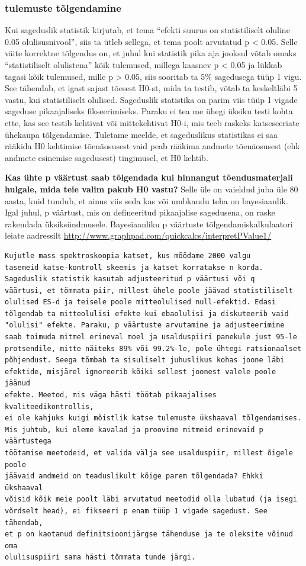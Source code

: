 \documentclass[]{book}
\begin{document}
\subsubsection{tulemuste tõlgendamine}\label{tulemuste-tolgendamine}

Kui sageduslik statistik kirjutab, et tema ``efekti suurus on
statistiliselt oluline 0.05 olulisusnivool'', siis ta ütleb sellega, et
tema poolt arvutatud p \textless{} 0.05. Selle väite korrektne tõlgendus
on, et juhul kui statistik pika aja jooksul võtab omaks ``statistiliselt
olulistena'' kõik tulemused, millega kaasnev p \textless{} 0.05 ja
lükkab tagasi kõik tulemused, mille p \textgreater{} 0.05, siis sooritab
ta 5\% sagedusega tüüp 1 vigu. See tähendab, et igast sajast tõesest
H0-st, mida ta testib, võtab ta keskeltläbi 5 vastu, kui statistiliselt
olulised. Sageduslik statistika on parim viis tüüp 1 vigade sageduse
pikaajaliseks fikseerimiseks. Paraku ei tea me ühegi üksiku testi kohta
ette, kas see testib kehtivat või mittekehtivat H0-i, mis teeb raskeks
katseseeriate ühekaupa tõlgendamise. Tuletame meelde, et sageduslikus
statistikas ei saa rääkida H0 kehtimise tõenäosusest vaid peab rääkima
andmete tõenäosusest (ehk andmete esinemise sagedusest) tingimusel, et
H0 kehtib.

\textbf{Kas ühte p väärtust saab tõlgendada kui hinnangut
tõendusmaterjali hulgale, mida teie valim pakub H0 vastu?} Selle üle on
vaieldud juba üle 80 aasta, kuid tundub, et ainus viis seda kas või
umbkaudu teha on bayesiaanlik. Igal juhul, p väärtust, mis on
defineeritud pikaajalise sagedusena, on raske rakendada üksiksündmusele.
Bayesiaanliku p väärtuste tõlgendamiskalkulaatori leiate aadressilt
\url{http://www.graphpad.com/quickcalcs/interpretPValue1/}

\begin{verbatim}
Kujutle mass spektroskoopia katset, kus mõõdame 2000 valgu 
tasemeid katse-kontroll skeemis ja katset korratakse n korda. 
Sageduslik statistik kasutab adjusteeritud p väärtusi või q 
väärtusi, et tõmmata piir, millest ühele poole jäävad statistiliselt 
olulised ES-d ja teisele poole mitteolulised null-efektid. Edasi 
tõlgendab ta mitteolulisi efekte kui ebaolulisi ja diskuteerib vaid 
"olulisi" efekte. Paraku, p väärtuste arvutamine ja adjusteerimine 
saab toimuda mitmel erineval moel ja usalduspiiri panekule just 95-le 
protsendile, mitte näiteks 89% või 99.2%-le, pole ühtegi ratsionaalset 
põhjendust. Seega tõmbab ta sisuliselt juhuslikus kohas joone läbi 
efektide, misjärel ignoreerib kõiki sellest joonest valele poole jäänud 
efekte. Meetod, mis väga hästi töötab pikaajalises kvaliteedikontrollis, 
ei ole kahjuks kuigi mõistlik katse tulemuste ükshaaval tõlgendamises. 
Mis juhtub, kui oleme kavalad ja proovime mitmeid erinevaid p väärtustega 
töötamise meetodeid, et valida välja see usalduspiir, millest õigele poole 
jäävaid andmeid on teaduslikult kõige parem tõlgendada? Ehkki ükshaaval 
võisid kõik meie poolt läbi arvutatud meetodid olla lubatud (ja isegi 
võrdselt head), ei fikseeri p enam tüüp 1 vigade sagedust. See tähendab, 
et p on kaotanud definitsioonijärgse tähenduse ja te oleksite võinud oma 
olulisuspiiri sama hästi tõmmata tunde järgi.
\end{verbatim}
\end{document}
